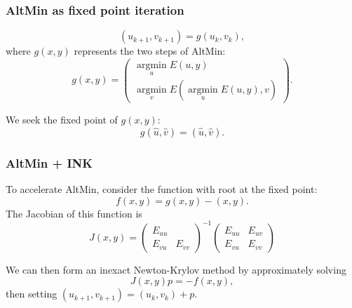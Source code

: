 \documentclass{beamer}
\DeclareMathOperator*{\argmin}{argmin}
\begin{document}
\begin{frame}
\frametitle{AltMin as fixed point iteration}

\begin{equation*}
	(u_{k+1}, v_{k+1}) = g(u_k,v_k),
\end{equation*}
where $g(x,y)$ represents the two steps of AltMin:
\begin{equation*}
	g(x,y) = \begin{pmatrix} \argmin\limits_u E(u, y) \\ \argmin\limits_v E(\argmin\limits_u E(u,y), v) \end{pmatrix}.
\end{equation*}

We seek the fixed point of $g(x,y)$:
\begin{equation*}
	g(\hat{u}, \hat{v}) = (\hat{u}, \hat{v}).
\end{equation*}

\end{frame}

\begin{frame}
\frametitle{AltMin + INK}

To accelerate AltMin, consider the function with root at the fixed point:
\begin{equation*}
	f(x,y) = g(x,y) - (x,y).
\end{equation*}
The Jacobian of this function is
\begin{equation*}
	J(x,y) = \begin{pmatrix} E_{uu} \\ E_{vu} & E_{vv} \end{pmatrix}^{-1} \begin{pmatrix} E_{uu} & E_{uv} \\ E_{vu} & E_{vv} \end{pmatrix}
\end{equation*}

We can then form an inexact Newton-Krylov method by approximately solving
\begin{equation*}
	J(x,y) p = -f(x,y),
\end{equation*}
then setting $(u_{k+1}, v_{k+1}) = (u_k, v_k) + p$.

\end{frame}
\end{document}
